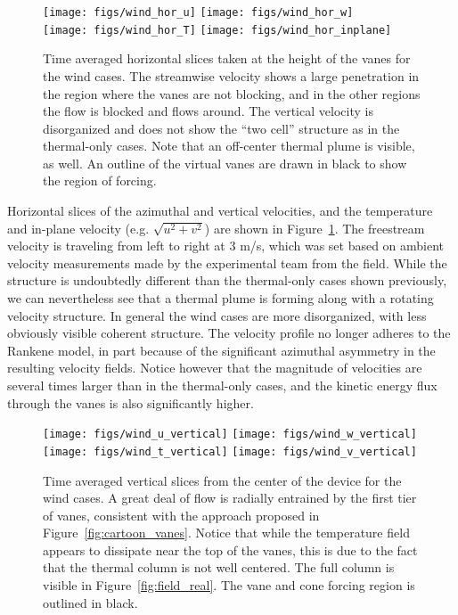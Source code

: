 %
%
\begin{figure}[htb]

  \centering
  \texttt{[image: figs/wind\_hor\_u]}
 \hfill
  \texttt{[image: figs/wind\_hor\_w]}
 \\
  \centering
  \texttt{[image: figs/wind\_hor\_T]}
 \hfill
  \texttt{[image: figs/wind\_hor\_inplane]}
 \caption{Time averaged horizontal slices taken at the height of the
 vanes for the wind cases. The streamwise velocity shows a large
 penetration in the region where the vanes are not blocking, and in the
 other regions the flow is blocked and flows around. The vertical
 velocity is disorganized and does not show the ``two cell'' structure
 as in the thermal-only cases.  Note that an off-center thermal plume is
 visible, as well. An outline of the virtual vanes are drawn in black to
 show the region of forcing.}  
 \label{fig:wind-hor}
\end{figure}


Horizontal slices of the azimuthal and vertical velocities, and the 
temperature and in-plane velocity (e.g. $\sqrt{u^2 + v^2}$) are shown in
Figure~\ref{fig:wind-hor}. The freestream velocity is traveling from
left to right at 3 m/s, which was set based on ambient velocity
measurements made by the experimental team from the field. While the
structure is undoubtedly different than the thermal-only cases shown
previously, we can nevertheless see that a thermal plume is forming
along with a rotating velocity structure. In general the wind cases are
more disorganized, with less obviously visible coherent
structure. The velocity profile no longer adheres to the Rankene model,
in part because of the significant azimuthal asymmetry in the resulting
velocity fields. 
Notice however that the magnitude of velocities are several
times larger than in the thermal-only cases, and the kinetic energy flux
through the vanes is also significantly higher.    

%
%

\begin{figure}[htb]
  \centering
  \texttt{[image: figs/wind\_u\_vertical]}
  \hfill
  \texttt{[image: figs/wind\_w\_vertical]}
  \\
  \centering
  \texttt{[image: figs/wind\_t\_vertical]}
  \hfill
  \texttt{[image: figs/wind\_v\_vertical]}
  \\
 \caption{Time averaged vertical slices from the center of the device
 for the wind cases. A great deal of flow is radially entrained by the
 first tier of vanes, consistent with the approach proposed in
 Figure~\ref{fig:cartoon_vanes}. Notice that while the temperature field
  appears to dissipate near the top of the vanes, this is due to the
 fact that the thermal column is not well centered. The full column is
 visible in Figure~\ref{fig:field_real}. The vane and cone forcing region is
 outlined in black.}
 \label{fig:wind-ver}
\end{figure}


